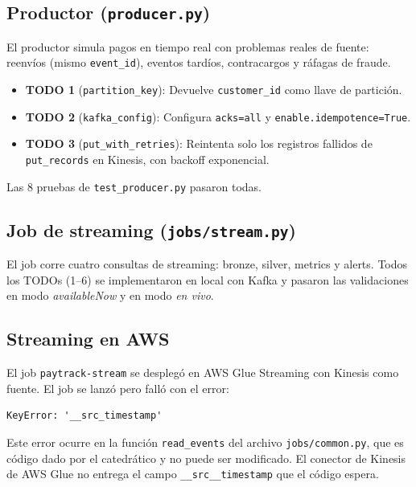 ﻿\documentclass[11pt,a4paper]{article}
\begin{document}
\subsection{Productor (\texttt{producer.py})}

El productor simula pagos en tiempo real con problemas reales de fuente: reenvíos (mismo \texttt{event\_id}), eventos tardíos, contracargos y ráfagas de fraude.

\begin{itemize}
  \item \textbf{TODO 1} (\texttt{partition\_key}): Devuelve \texttt{customer\_id} como llave de partición.
  \item \textbf{TODO 2} (\texttt{kafka\_config}): Configura \texttt{acks=all} y \texttt{enable.idempotence=True}.
  \item \textbf{TODO 3} (\texttt{put\_with\_retries}): Reintenta solo los registros fallidos de \texttt{put\_records} en Kinesis, con backoff exponencial.
\end{itemize}

Las 8 pruebas de \texttt{test\_producer.py} pasaron todas.

\subsection{Job de streaming (\texttt{jobs/stream.py})}

El job corre cuatro consultas de streaming: bronze, silver, metrics y alerts. Todos los TODOs (1--6) se implementaron en local con Kafka y pasaron las validaciones en modo \emph{availableNow} y en modo \emph{en vivo}.

\subsection{Streaming en AWS}

El job \texttt{paytrack-stream} se desplegó en AWS Glue Streaming con Kinesis como fuente. El job se lanzó pero falló con el error:

\begin{lstlisting}
KeyError: '__src_timestamp'
\end{lstlisting}

Este error ocurre en la función \texttt{read\_events} del archivo \texttt{jobs/common.py}, que es código dado por el catedrático y no puede ser modificado. El conector de Kinesis de AWS Glue no entrega el campo \texttt{\_\_src\_\_timestamp} que el código espera.
\end{document}
